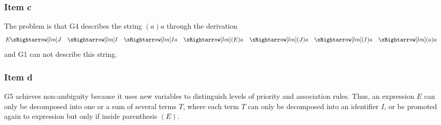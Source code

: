 {\subsubsection{Item c}
The problem is that G4 describes the string $(a)a$ through the derivation
\begin{alignat*}{7}
	E
	&\lmd J
	&&\lmd I
	&&\lmd Ia
	&&\lmd (E)a
	&&\lmd (J)a
	&&\lmd (I)a
	&&\lmd (a)a
\end{alignat*}
and G1 can not describe this string.
\subsubsection{Item d}
G5 achieves non-ambiguity because it uses new variables to distinguish levels of priority and association rules. Thus, an expression $E$ can only be decomposed into one or a sum of several terms $T$, where each term $T$ can only be decomposed into an identifier $I$, or be promoted again to expression but only if inside parenthesis $(E)$.
}